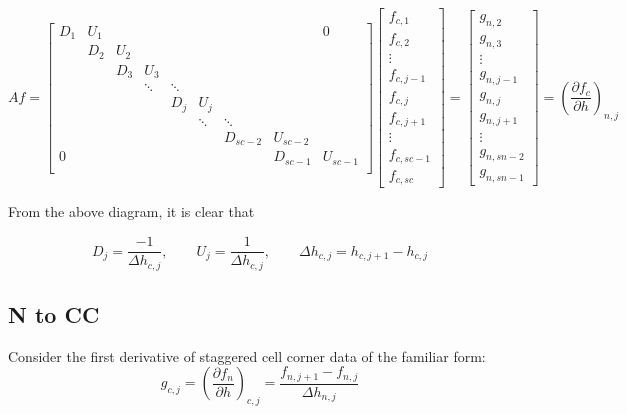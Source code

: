\documentclass[11pt]{article}
\begin{document}
\[
Af = 
\left[
\begin{array}{ccccccccc}
D_{1} & U_{1} &  &   &   &   &   &   & 0 \\
  & D_{2} & U_{2} &   &   &   &   &   &   \\
  &   & D_{3} & U_{3} &   &   &   &   &   \\
  &   &  & \ddots & \ddots &   &   &   &   \\
  &   &   &   & D_{j} & U_{j} &   &   &   \\
  &   &   &   &  & \ddots & \ddots &   &   \\
  &   &   &   &   &   & D_{sc-2} & U_{sc-2} &   \\
 0 &   &   &   &   &   &   & D_{sc-1} & U_{sc-1} \\
\end{array}
\right]
\left[ \begin{array}{c}
f_{c,1} \\ f_{c,2} \\ \vdots \\ f_{c,j-1} \\ f_{c,j} \\ f_{c,j+1} \\ \vdots \\ f_{c,sc-1} \\ f_{c,sc}
\end{array} \right]
=
\left[ \begin{array}{c}
g_{n,2} \\ g_{n,3} \\ \vdots \\ g_{n,j-1} \\ g_{n,j} \\ g_{n,j+1} \\ \vdots \\ g_{n,sn-2} \\ g_{n,sn-1}
\end{array} \right]
 = \left( \frac{\partial f_{c}}{\partial h} \right)_{n,j}
\]

From the above diagram, it is clear that

\begin{equation}
  D_j = \frac{-1}{\Delta h_{c,j}}, \qquad
  U_j = \frac{1}{\Delta h_{c,j}}, \qquad
  \Delta h_{c,j} = h_{c,j+1}-h_{c,j}
\end{equation}

\subsection{N to CC}
Consider the first derivative of staggered cell corner data of the familiar form:
\begin{equation}
  g_{c,j} = \left( \frac{\partial f_{n}}{\partial h} \right)_{c,j} = \frac{f_{n,j+1}-f_{n,j}}{\Delta h_{n,j}}
\end{equation}
\end{document}
